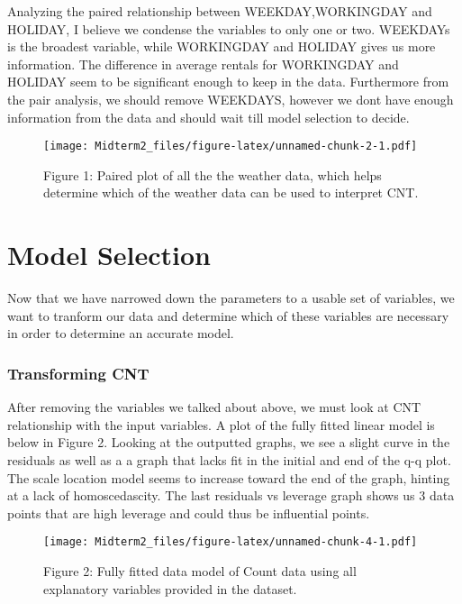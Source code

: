 \documentclass[]{article}
\begin{document}
Analyzing the paired relationship between WEEKDAY,WORKINGDAY and
HOLIDAY, I believe we condense the variables to only one or two.
WEEKDAYs is the broadest variable, while WORKINGDAY and HOLIDAY gives us
more information. The difference in average rentals for WORKINGDAY and
HOLIDAY seem to be significant enough to keep in the data. Furthermore
from the pair analysis, we should remove WEEKDAYS, however we dont have
enough information from the data and should wait till model selection to
decide.

\begin{figure}
\centering
\texttt{[image: Midterm2\_files/figure-latex/unnamed-chunk-2-1.pdf]}
\caption{\label{fig:vars} Figure 1: Paired plot of all the the weather
data, which helps determine which of the weather data can be used to
interpret CNT.}
\end{figure}

\section{Model Selection}\label{model-selection}

Now that we have narrowed down the parameters to a usable set of
variables, we want to tranform our data and determine which of these
variables are necessary in order to determine an accurate model.

\subsubsection{Transforming CNT}\label{transforming-cnt}

After removing the variables we talked about above, we must look at CNT
relationship with the input variables. A plot of the fully fitted linear
model is below in Figure 2. Looking at the outputted graphs, we see a
slight curve in the residuals as well as a a graph that lacks fit in the
initial and end of the q-q plot. The scale location model seems to
increase toward the end of the graph, hinting at a lack of
homoscedascity. The last residuals vs leverage graph shows us 3 data
points that are high leverage and could thus be influential points.

\begin{figure}
\centering
\texttt{[image: Midterm2\_files/figure-latex/unnamed-chunk-4-1.pdf]}
\caption{\label{fig:lm} Figure 2: Fully fitted data model of Count data
using all explanatory variables provided in the dataset.}
\end{figure}
\end{document}
